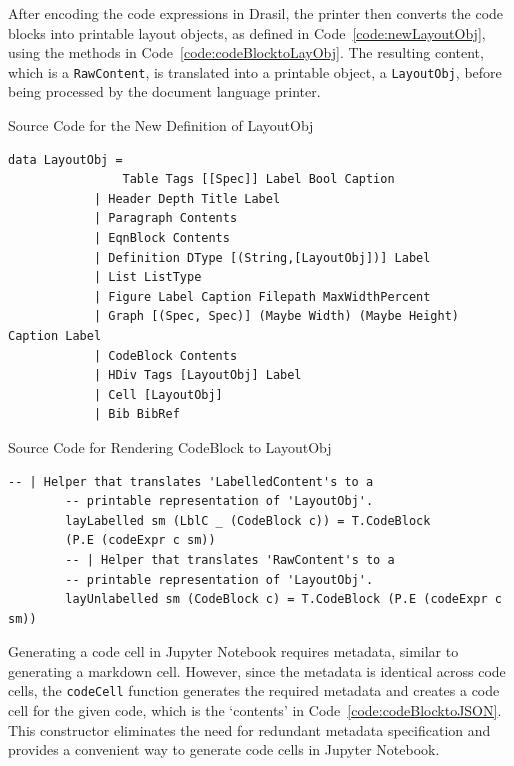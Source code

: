 After encoding the code expressions in Drasil, the printer then converts the 
code blocks into printable layout objects, as defined in 
Code~\ref{code:newLayoutObj}, using the methods in 
Code~\ref{code:codeBlocktoLayObj}. The resulting content, which is a 
\texttt{RawContent}, is translated into a printable object, a 
\texttt{LayoutObj}, before being processed by the document language printer. 

\begin{listing}[h!]
	\caption{Source Code for the New Definition of LayoutObj}
	\label{code:newLayoutObj}
	\begin{lstlisting}[language=haskell1]
		data LayoutObj = 
				Table Tags [[Spec]] Label Bool Caption                          
			| Header Depth Title Label                                       
			| Paragraph Contents                                              
			| EqnBlock Contents                                               
			| Definition DType [(String,[LayoutObj])] Label                   
			| List ListType                                                   
			| Figure Label Caption Filepath MaxWidthPercent                  
			| Graph [(Spec, Spec)] (Maybe Width) (Maybe Height) Caption Label 
			| CodeBlock Contents  
			| HDiv Tags [LayoutObj] Label                                    
			| Cell [LayoutObj] 
			| Bib BibRef     
	\end{lstlisting}
\end{listing}

\begin{listing}[h!]
	\caption{Source Code for Rendering CodeBlock to LayoutObj}
	\label{code:codeBlocktoLayObj}
	\begin{lstlisting}[language=haskell1]
		-- | Helper that translates 'LabelledContent's to a 
		-- printable representation of 'LayoutObj'.
		layLabelled sm (LblC _ (CodeBlock c)) = T.CodeBlock 
		(P.E (codeExpr c sm))
		-- | Helper that translates 'RawContent's to a 
		-- printable representation of 'LayoutObj'.
		layUnlabelled sm (CodeBlock c) = T.CodeBlock (P.E (codeExpr c sm))
	\end{lstlisting}
\end{listing}

Generating a code cell in Jupyter Notebook requires metadata, similar to 
generating a markdown cell. However, since the metadata is identical across 
code cells, the \texttt{codeCell} function generates the required metadata and 
creates a code cell for the given code, which is the `contents' in 
Code~\ref{code:codeBlocktoJSON}. This constructor eliminates the need for 
redundant metadata specification and provides a convenient way to generate code 
cells in Jupyter Notebook.

